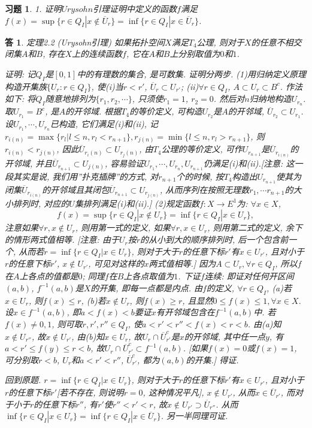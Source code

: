 \documentclass{ctexart}%
\newtheorem*{exercise}{习题}
\newtheorem*{solution}{答}
\theoremstyle{definition}
\theoremstyle{remark}
\begin{document}
\begin{exercise}1. 证明$Urysohn$引理证明中定义的函数$f$满足$f(x)=\sup\{r\in Q_I|x\notin \overline{U}_r\}
=\inf\{r\in Q_I|x\in \overline{U}_r\}$.
\end{exercise}
\begin{solution}
定理2.2 (Urysohn引理) 如果拓扑空间$X$满足$T_4$公理, 则对于$X$的任意不相交闭集$A$和$B$, 存在$X$上的连续函数$f$, 它在$A$和$B$上分别取值为$0$和$1$. 

证明: 记$Q_I$是$[0,1]$中的有理数的集合, 是可数集. 证明分两步. (1)用归纳定义原理构造开集族$\{U_r:r\in Q_I\}$, 使(i)当$r<r'$, $\overline{U}_r\subset U_{r'}$; (ii)$\forall r\in Q_I$, $A\subset U_r\subset B^c$. 作法如下: 将$Q_I$随意地排列为$\{r_1, r_2,\cdots\}$, 只须使$r_1=1$, $r_2=0$. 然后对$n$归纳地构造$U_{r_n}$.取$U_{r_1}=B^c$, 是$A$的开邻域. 根据$T_4$的等价定义, 可构造$U_{r_2}$是$A$的开邻域, $\overline{U}_{r_2}\subset U_{r_1}$. 设$U_{r_1},\cdots, U_{r_n}$已构造, 它们满足(i)和(ii), 记$r_{i(n)}
=\max\{r_l|l\leq n, r_l < r_{n+1}\},r_{j(n)}=\min\{l\leq n, r_l>r_{n+1}\}$, 则$r_{i(n)}< r_{j(n)}$, 因此$\overline{U}_{r_i(n)}\subset U_{r_j(n)}$, 由$T_4$公理的等价定义, 可作$U_{r_{n+1}}$是$\overline{U}_{r_{i(n)}}$的开邻域, 并且$\overline{U}_{r_{n+1}}\subset U_{j(n)}$, 容易验证$U_{r_1},\cdots, U_{r_n}, U_{r_{n+1}}$仍满足(i)和(ii).[注意: 这一段其实是说, 我们用''扑克插牌''的方式, 对$r_{n+1}$个的时候, 按$T_4$构造出$U_{r_{n+1}}$使其为闭集$\overline{U}_{r_{i(n)}}$的开邻域且其闭包$\overline{U}_{r_{n+1}}\subset U_{r_{j(n)}}$, 从而序列在按照无理数$r_1,\cdots r_{n+1}$的大小排列时, 对应的$U$集排列满足(i)和(ii).] (2)规定函数$f: X\rightarrow E^1$为: $\forall x\in X$, 
$$f(x)=\sup \{r\in Q_I|x\notin U_r\}=\inf\{r\in Q_I|x\in U_r\},$$注意如果$\forall r, x\notin U_r$, 则用第一式的定义, 如果$\forall r, x\in U_r$, 则用第二式的定义, 余下的情形两式值相等. [注意: 由于$U_r$按$r$的从小到大的顺序排列时, 后一个包含前一个, 从而若$r=\inf\{r\in Q_I|x\in U_r\}$, 则对于大于$r$的任意下标$r'$有$x\in U_{r'}$, 且对小于$r$的任意下标$r'$, $x\notin U_{r'}$, 可见对这样的$x$两式值相等.] 因为$A\subset U_r, \forall r\in Q_I$, 所以$f$在$A$上各点的值都是$0$; 同理$f$在$B$上各点取值为$1$. 下证$f$连续: 即证对任何开区间$(a,b)$, $f^{-1}(a,b)$是$X$的开集, 即每一点都是内点. 由$f$的定义, $\forall r\in Q_I$, (a)若$ x\in U_r$, 则$f(x)\leq r$, (b)若$x\notin U_r$, 则$f(x)\geq r$, 且显然$0\leq f(x)\leq 1, \forall x\in X$. 设$x\in f^{-1}(a,b)$, 即$a < f(x) < b$要证$x$有开邻域包含在$f^{-1}(a,b)$中. 若$f(x)\neq 0,1$, 则可取$r,r',r''\in Q_I$, 使$a<r'<r''<f(x)<r<b$. 由(a)知 $x\notin U_{r''}$, 故$x\notin U_{r'}$, 由(b)知$x\in U_r$, 故$U_r\cap \overline{U}^c_{r'}$是$x$的开邻域, 其中任一点$y$, 有$a<r'\leq f(y)\leq r<b$, 故$U_r\cap \overline{U}^c_{r'}\subset f^{-1}(a,b)$. [如果$f(x)=0$或$f(x)=1$, 可分别取$r<b$, $U_r$和$a<r'<r''$, $\overline{U}^c_{r'}$, 都为$(a,b)$的开集.] 得证.

回到原题. $r=\inf\{r\in Q_I|x\in U_r\}$, 则对于大于$r$的任意下标$r'$有$x\in U_{r'}$, 且对小于$r$的任意下标$r'$[若不存在, 则说明$r=0$, 这种情况平凡], $x\notin U_{r'}$, 从而$x\in \overline{U}_{r'}$, 而对于小于$r$的任意下标$r''$, 有$r'$使$r''<r'<r$, 故$x\notin U_{r'}\supset \overline{U}_{r''}$. 从而$\inf\{r\in Q_I|x\in U_r\}=\inf\{r\in Q_I|x\in \overline{U}_r\}$. 另一半同理可证. 
\end{solution}
\end{document}
